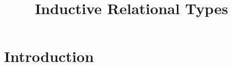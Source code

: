\documentclass[acmsmall]{acmart}
\title{Inductive Relational Types}
\theoremstyle{definition}
\begin{document}
\newcommand{\J}[1]{\texttt{\color{RoyalBlue} #1}}

\newcommand{\lab}[1]{\small \text{\color{Gray}\ [#1]}}
\newcommand{\entails}{\vdash}
\newcommand{\satisfies}{\vDash}
\newcommand{\given}{\dashv}
\newcommand{\with}{\ \diamond\ }
\newcommand{\notfree}{\ \#\ }
\newcommand{\consis}{\ \star}
\newcommand{\safe}{\ \checkmark}
\newcommand{\relational}{\ \Re}

\newcommand{\factorsinto}{\Vvdash}


\newcommand{\allsafe}{\ \Re\checkmark}



\newcommand{\foreign}{\varnothing}
\newcommand{\closed}{\bullet}
\newcommand{\local}{\blacktriangle}
\newcommand{\open}{\circ}



\newcommand{\multi}[1]{\widebar{\ #1\ }}
\newcommand{\hastype}{:}
\newcommand{\pattype}{\ \lozenge\ }
\newcommand{\liftfun}{:}
 
\newcommand{\subtypes}{<:}
\newcommand{\supertypes}{:>}
\newcommand{\I}{\hspace{4mm}}
\newcommand{\Z}{.\hspace{4mm}}
\newcommand{\Alpha}{\mathrm{A}}
\newcommand{\Tau}{\mathrm{T}}
\newcommand{\B}[1]{\textbf{#1}}
\newcommand{\F}[1]{\text{#1}}
\newcommand{\bigand}{\bigwedge\nolimits}
\newcommand{\bigor}{\bigvee\nolimits}
\newcommand{\C}[1]{\color{teal} \rhd\ \emph{#1}}
\newcommand{\com}[1]{\color{Gray} \emph{#1}}
\newcommand{\D}[1]{\small \textsc{#1}}
\newcommand{\FIG}[1]{Fig. {\color{red} \ref{#1}}}
\newcommand{\TODO}[1]{\noindent \B{\color{red} TODO: #1}}

\newcommand{\is}{\ ::=\ }
\newcommand{\sep}{\ \ |\ \ }
\newcommand{\nonterm}[1]{#1\ }
\newcommand{\contin}{|\ \ \ \ \ \ \ }
\newcommand{\case}{\B{case }}
\newcommand{\wrt}{\B{wrt }}
     


\newcommand{\tl}{\textasciitilde{}}
\newcommand{\fieldmap}{\J{\tl>}}
\newcommand{\typdiff}{\J{\textbackslash}}

\maketitle


\section{Introduction}
\end{document}
